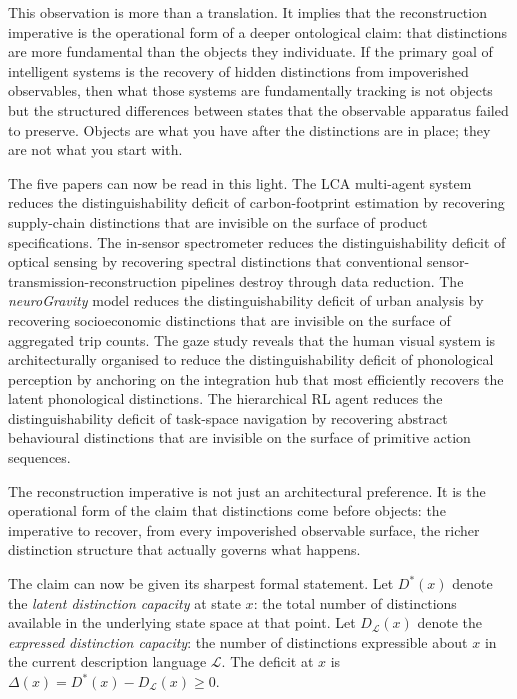 \documentclass[12pt, letterpaper]{article}
\theoremstyle{remark}
\newcommand{\neuro}{\textit{neuroGravity}}
\begin{document}
This observation is more than a translation.  It implies that the
reconstruction imperative is the operational form of a deeper ontological
claim: that distinctions are more fundamental than the objects they
individuate.  If the primary goal of intelligent systems is the recovery
of hidden distinctions from impoverished observables, then what those
systems are fundamentally tracking is not objects but the structured
differences between states that the observable apparatus failed to preserve.
Objects are what you have after the distinctions are in place; they are not
what you start with.

The five papers can now be read in this light.  The LCA multi-agent system
reduces the distinguishability deficit of carbon-footprint estimation by
recovering supply-chain distinctions that are invisible on the surface of
product specifications.  The in-sensor spectrometer reduces the
distinguishability deficit of optical sensing by recovering spectral
distinctions that conventional sensor-transmission-reconstruction pipelines
destroy through data reduction.  The \neuro{} model reduces the
distinguishability deficit of urban analysis by recovering socioeconomic
distinctions that are invisible on the surface of aggregated trip counts.
The gaze study reveals that the human visual system is architecturally
organised to reduce the distinguishability deficit of phonological
perception by anchoring on the integration hub that most efficiently
recovers the latent phonological distinctions.  The hierarchical RL agent
reduces the distinguishability deficit of task-space navigation by recovering
abstract behavioural distinctions that are invisible on the surface of
primitive action sequences.

The reconstruction imperative is not just an architectural preference.  It
is the operational form of the claim that distinctions come before objects:
the imperative to recover, from every impoverished observable surface, the
richer distinction structure that actually governs what happens.

The claim can now be given its sharpest formal statement.  Let $D^*(x)$
denote the \emph{latent distinction capacity} at state $x$: the total
number of distinctions available in the underlying state space at that
point.  Let $D_{\mathcal{L}}(x)$ denote the \emph{expressed distinction
capacity}: the number of distinctions expressible about $x$ in the current
description language $\mathcal{L}$.  The deficit at $x$ is
$\Delta(x) = D^*(x) - D_{\mathcal{L}}(x) \geq 0$.
\end{document}
